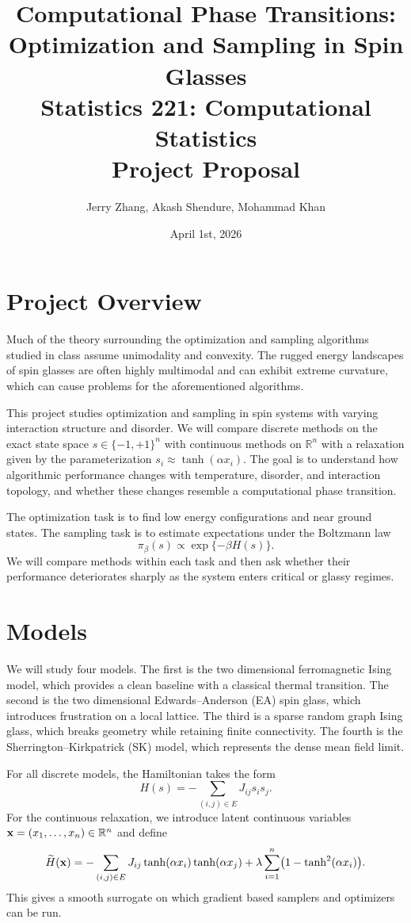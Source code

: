 \documentclass{article}
\title{Computational Phase Transitions: \\ Optimization and Sampling in Spin Glasses \\ \vspace{30pt}
\Large Statistics 221: Computational Statistics \\
\Large Project Proposal}
\author{Jerry Zhang, Akash Shendure, Mohammad Khan}
\date{April 1st, 2026}
\begin{document}
\maketitle

\section{Project Overview}
Much of the theory surrounding the optimization and sampling algorithms studied in class assume unimodality and convexity. The rugged energy landscapes of spin glasses are often highly multimodal and can exhibit extreme curvature, which can cause problems for the aforementioned algorithms.

This project studies optimization and sampling in spin systems with varying interaction structure and disorder. We will compare discrete methods on the exact state space $s \in \{-1,+1\}^n$ with continuous methods on $\mathbb{R}^n$ with a relaxation given by the parameterization $s_i \approx \tanh(\alpha x_i)$. The goal is to understand how algorithmic performance changes with temperature, disorder, and interaction topology, and whether these changes resemble a computational phase transition.

The optimization task is to find low energy configurations and near ground states. The sampling task is to estimate expectations under the Boltzmann law
$$
\pi_\beta(s) \propto \exp\{-\beta H(s)\}.
$$
We will compare methods within each task and then ask whether their performance deteriorates sharply as the system enters critical or glassy regimes.

\section{Models}

We will study four models. The first is the two dimensional ferromagnetic Ising model, which provides a clean baseline with a classical thermal transition. The second is the two dimensional Edwards--Anderson (EA) spin glass, which introduces frustration on a local lattice. The third is a sparse random graph Ising glass, which breaks geometry while retaining finite connectivity. The fourth is the Sherrington--Kirkpatrick (SK) model, which represents the dense mean field limit.

For all discrete models, the Hamiltonian takes the form
$$
H(s) = - \sum_{(i,j)\in E} J_{ij} s_i s_j.
$$
For the continuous relaxation, we introduce latent continuous variables $\vb{x}=(x_1,\ldots,x_n) \in \mathbb{R}^n$ and define
$$
\widetilde H(\vb{x})
=
- \sum_{(i,j)\in E} J_{ij}\tanh(\alpha x_i)\tanh(\alpha x_j)
+
\lambda \sum_{i=1}^n \bigl(1-\tanh^2(\alpha x_i)\bigr).
$$
This gives a smooth surrogate on which gradient based samplers and optimizers can be run.
\end{document}
